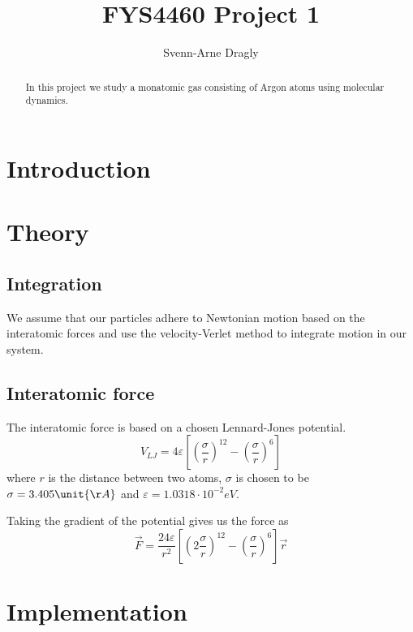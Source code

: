 \documentclass[reprint,floatfix,amsmath,amssymb,aps,pra]{revtex4-1}
\begin{document}
\title{FYS4460 Project 1}
\author{Svenn-Arne Dragly}

\begin{abstract}
In this project we study a monatomic gas consisting of Argon atoms using molecular dynamics.
\end{abstract}

\maketitle

\section{Introduction}

\section{Theory}

\subsection{Integration}

We assume that our particles adhere to Newtonian motion based on the interatomic forces and use the velocity-Verlet method to integrate motion in our system.

\subsection{Interatomic force}

The interatomic force is based on a chosen Lennard-Jones potential.
\begin{equation}
    V_{LJ} = 4 \varepsilon \left[ \left( \frac {\sigma} {r} \right)^{12} - \left( \frac {\sigma} {r} \right)^6 \right]
\end{equation}
where $r$ is the distance between two atoms, $\sigma$ is chosen to be $\sigma = 3.405 \unit{\AA}$ and $\varepsilon = 1.0318 \cdot 10^{−2} \unit{eV}$.

Taking the gradient of the potential gives us the force as
\begin{equation}
 \vec F = \frac{24 \varepsilon}{r^{2}} \left[ \left( 2 \frac {\sigma} {r} \right)^{12} - \left( \frac {\sigma} {r} \right)^6 \right] \vec r
\end{equation}

\section{Implementation}
\end{document}
